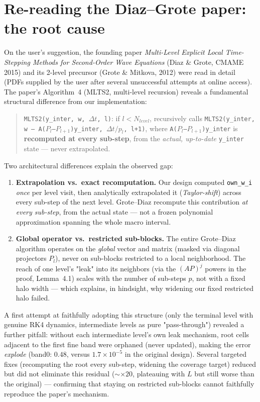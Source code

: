 \documentclass[11pt]{article}
\newcommand{\code}[1]{\texttt{#1}}
\begin{document}
\section{Re-reading the Diaz--Grote paper: the root cause}
\label{sec:groteread}

On the user's suggestion, the founding paper \emph{Multi-Level
Explicit Local Time-Stepping Methods for Second-Order Wave Equations}
(Diaz \& Grote, CMAME 2015) and its 2-level precursor (Grote \&
Mitkova, 2012) were read in detail (PDFs supplied by the user after
several unsuccessful attempts at online access). The paper's
Algorithm~4 (MLTS2, multi-level recursion) reveals a fundamental
structural difference from our implementation:
\begin{quote}
\code{MLTS2(y\_inter, w, $\Delta t$, l)}: if $l<N_{level}$, recursively
calls \code{MLTS2(y\_inter, w -- A($P_l$--$P_{l+1}$)y\_inter,
$\Delta t/p_l$, l+1)}, where \code{A($P_l$--$P_{l+1}$)y\_inter} is
\textbf{recomputed at every sub-step}, from the \emph{actual, up-to-date}
\code{y\_inter} state --- never extrapolated.
\end{quote}
Two architectural differences explain the observed gap:
\begin{enumerate}
  \item \textbf{Extrapolation vs.\ exact recomputation.} Our design
  computed \code{own\_w\_i} \emph{once} per level visit, then
  analytically extrapolated it (\emph{Taylor-shift}) across every
  sub-step of the next level. Grote--Diaz recompute this contribution
  \emph{at every sub-step}, from the actual state --- not a frozen
  polynomial approximation spanning the whole macro interval.
  \item \textbf{Global operator vs.\ restricted sub-blocks.} The entire
  Grote--Diaz algorithm operates on the \emph{global} vector and matrix
  (masked via diagonal projectors $P_l$), never on sub-blocks restricted
  to a local neighborhood. The reach of one level's "leak" into its
  neighbors (via the $(AP)^j$ powers in the proof, Lemma~4.1) scales
  with the number of sub-steps $p$, not with a fixed halo width ---
  which explains, in hindsight, why widening our fixed restricted halo
  failed.
\end{enumerate}
A first attempt at faithfully adopting this structure (only the
terminal level with genuine RK4 dynamics, intermediate levels as pure
"pass-through") revealed a further pitfall: without each intermediate
level's own leak mechanism, root cells adjacent to the first fine band
were orphaned (never updated), making the error \emph{explode} (band0:
$0.48$, versus $1.7\times10^{-5}$ in the original design). Several
targeted fixes (recomputing the root every sub-step, widening the
coverage target) reduced but did not eliminate this residual
($\sim\times20$, plateauing with $L$ but still worse than the
original) --- confirming that staying on restricted sub-blocks cannot
faithfully reproduce the paper's mechanism.
\end{document}

